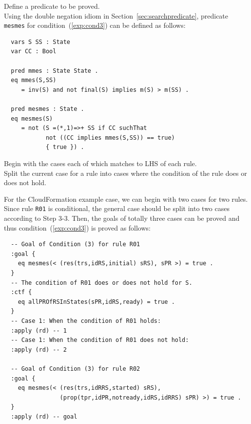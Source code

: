 \documentclass[12pt]{report}
\begin{document}
 Define a predicate to be proved.\\
Using the double negation idiom in Section~\ref{sec:searchpredicate},
predicate {\tt mesmes} for condition~(\ref{exp:cond3}) can be defined
as follows:
\small
\begin{verbatim}
  vars S SS : State
  var CC : Bool

  pred mmes : State State .
  eq mmes(S,SS)
     = inv(S) and not final(S) implies m(S) > m(SS) .

  pred mesmes : State .
  eq mesmes(S)
     = not (S =(*,1)=>+ SS if CC suchThat
            not ((CC implies mmes(S,SS)) == true)
            { true }) .
\end{verbatim}
\normalsize

 Begin with the cases each of which matches to
LHS of each rule. \\ 
 Split the current case for a rule into
cases where the condition of the rule does or does not hold. 

For the CloudFormation example case, we can begin with two cases for
two rules. Since rule {\tt R01} is conditional, the general case
should be split into two cases according to Step 3-3. Then, the goals
of totally three cases can be proved and thus
condition~(\ref{exp:cond3}) is proved as follows:
\small
\begin{verbatim}
  -- Goal of Condition (3) for rule R01
  :goal {
    eq mesmes(< (res(trs,idRS,initial) sRS), sPR >) = true .
  }
  -- The condition of R01 does or does not hold for S.
  :ctf {
    eq allPROfRSInStates(sPR,idRS,ready) = true .
  }
  -- Case 1: When the condition of R01 holds:
  :apply (rd) -- 1
  -- Case 1: When the condition of R01 does not hold:
  :apply (rd) -- 2

  -- Goal of Condition (3) for rule R02
  :goal {
    eq mesmes(< (res(trs,idRRS,started) sRS),
                (prop(tpr,idPR,notready,idRS,idRRS) sPR) >) = true .
  }
  :apply (rd) -- goal
\end{verbatim}
\normalsize

\end{document}
